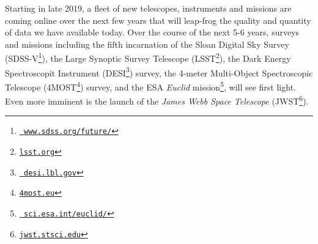 \smallskip
\smallskip
\noindent
Starting in late 2019, a fleet of new telescopes, instruments and missions are coming 
online over the next few years that will leap-frog the quality and
quantity of data we have available today. Over the course of the next
5-6 years, surveys and missions including the fifth incarnation of the
Sloan Digital Sky Survey
(SDSS-V\footnote{\href{www.sdss.org/future/}{{\tt
www.sdss.org/future/}}}), the Large Synoptic Survey Telescope
(LSST\footnote{\href{lsst.org}{{\tt lsst.org}}}), the Dark Energy
Spectroscopit Instrument (DESI\footnote{\href{desi.lbl.gov}{{\tt
desi.lbl.gov}}}) survey, the 4-meter Multi-Object Spectroscopic
Telescope (4MOST\footnote{\href{4most.eu}{{\tt 4most.eu}}}) survey,
and the ESA {\it Euclid}
mission\footnote{\href{sci.esa.int/euclid/}{{\tt
sci.esa.int/euclid/}}}, will see first light. Even more imminent is
the launch of the {\it James Webb Space Telescope}
(JWST\footnote{\href{jwst.stsci.edu}{{\tt jwst.stsci.edu}}}).




